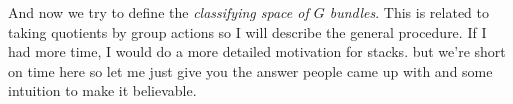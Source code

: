 \documentclass[./main.tex]{subfiles}
\begin{document}
And now we try to define the \emph{classifying space of $G$ bundles}.
This is related to taking quotients by group actions
so I will describe the general procedure.
If I had more time, I would do a more detailed motivation for stacks.
but we're short on time here so let me just give you the answer
people came up with and some intuition to make it believable.
  
  
\end{document}
